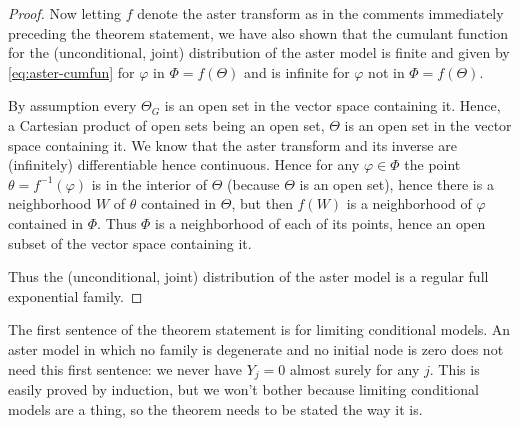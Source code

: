 \begin{proof}
Now letting $f$ denote the aster transform as in the comments immediately
preceding the theorem statement, we have also shown that
the cumulant function for the (unconditional, joint) distribution of
the aster model is finite and given by \eqref{eq:aster-cumfun} for
$\varphi$ in $\Phi = f(\Theta)$ and is infinite for
$\varphi$ not in $\Phi = f(\Theta)$.

By assumption every $\Theta_G$ is an open set in the vector space
containing it.  Hence, a Cartesian product of open sets being an open set,
$\Theta$ is an open set in the vector space containing it.
We know that the aster transform and its inverse are (infinitely)
differentiable hence continuous.  Hence for any $\varphi \in \Phi$
the point $\theta = f^{-1}(\varphi)$ is in the interior of $\Theta$
(because $\Theta$ is an open set), hence there is a neighborhood $W$
of $\theta$ contained in $\Theta$, but then $f(W)$ is a neighborhood of
$\varphi$ contained in $\Phi$.  Thus $\Phi$ is a neighborhood of each
of its points, hence an open subset of the vector space containing it.

Thus the (unconditional, joint) distribution of the aster model
is a regular full exponential family.
\end{proof}

The first sentence of the theorem statement is for limiting conditional
models.
An aster model in which no family is degenerate and no initial node is zero
does not need this first sentence: we never have $Y_j = 0$ almost surely
for any $j$.  This is easily proved by induction, but we won't bother
because limiting conditional models are a thing, so the theorem needs
to be stated the way it is.

